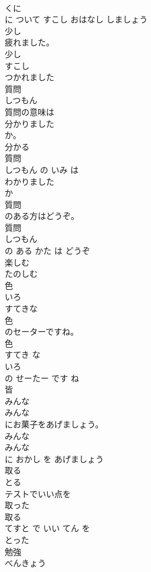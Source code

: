 \documentclass[8pt]{extreport}
\begin{document}
\begin{CJK}{UTF8}{min}
\\	くに
\\	に ついて すこし おはなし しましょう	
\\	少し
\\	疲れました。	
\\	少し 
\\	すこし
\\	つかれました	
\\	質問	
\\	しつもん	
\\	質問の意味は
\\	分かりました
\\	か。	
\\	分かる 
\\	質問 
\\	しつもん の いみ は 
\\	わかりました
\\	か	
\\	質問
\\	のある方はどうぞ。	
\\	質問 
\\	しつもん
\\	の ある かた は どうぞ	
\\	楽しむ	
\\	たのしむ	
\\	色	
\\	いろ	
\\	すてきな
\\	色
\\	のセーターですね。	
\\	色 
\\	すてき な 
\\	いろ
\\	の せーたー です ね	
\\	皆	
\\	みんな	
\\	みんな
\\	にお菓子をあげましょう。	
\\	みんな 
\\	みんな
\\	に おかし を あげましょう	
\\	取る	
\\	とる	
\\	テストでいい点を
\\	取った
\\	取る 
\\	てすと で いい てん を 
\\	とった
\\	勉強	
\\	べんきょう	

\end{CJK}
\end{document}
